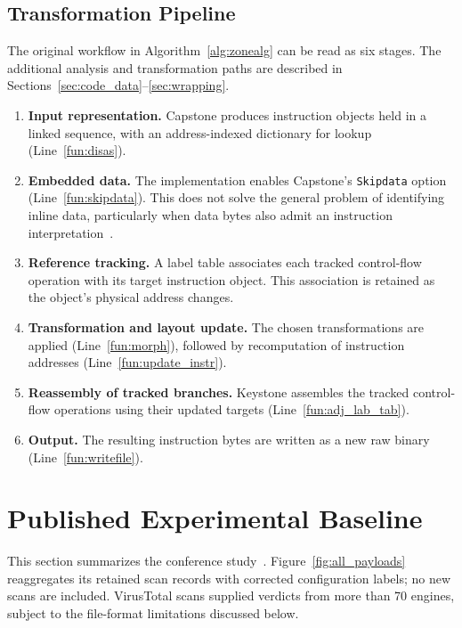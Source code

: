 \documentclass[runningheads]{llncs}
\begin{document}
\subsection{Transformation Pipeline}
The original workflow in Algorithm~\ref{alg:zonealg} can be read as six stages. The additional analysis and transformation paths are described in Sections~\ref{sec:code_data}--\ref{sec:wrapping}.

\begin{enumerate}
\item \textbf{Input representation.}
    Capstone produces instruction objects held in a linked sequence, with an address-indexed dictionary for lookup (Line~\ref{fun:disas}).

\item \textbf{Embedded data.}
    The implementation enables Capstone's \texttt{Skipdata} option (Line~\ref{fun:skipdata}). This does not solve the general problem of identifying inline data, particularly when data bytes also admit an instruction interpretation~\cite{bin2binobf}.

\item \textbf{Reference tracking.}
    A label table associates each tracked control-flow operation with its target instruction object. This association is retained as the object's physical address changes.

\item \textbf{Transformation and layout update.}
    The chosen transformations are applied (Line~\ref{fun:morph}), followed by recomputation of instruction addresses (Line~\ref{fun:update_instr}).

\item \textbf{Reassembly of tracked branches.}
    Keystone assembles the tracked control-flow operations using their updated targets (Line~\ref{fun:adj_lab_tab}).

\item \textbf{Output.}
    The resulting instruction bytes are written as a new raw binary (Line~\ref{fun:writefile}).

\end{enumerate}

\section{Published Experimental Baseline}\label{sec:results}


This section summarizes the conference study~\cite{zone_secrypt_2026}.
Figure~\ref{fig:all_payloads} reaggregates its retained scan records with
corrected configuration labels; no new scans are included. VirusTotal scans supplied verdicts from more than 70 engines, subject to the file-format limitations discussed below.
\end{document}
